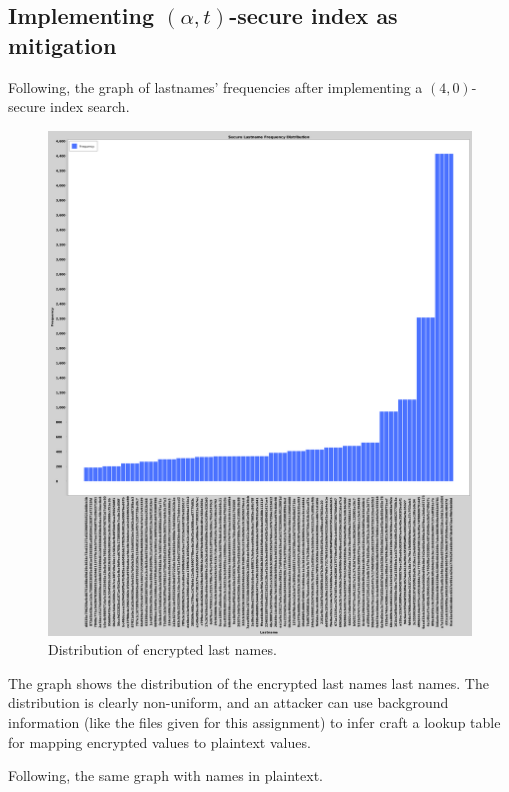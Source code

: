 \subsection{Implementing $(\alpha, t)$-secure index as mitigation}

Following, the graph of lastnames' frequencies after implementing a $(4, 0)$-secure index search.

\begin{figure}[h!]
    \centering
    \includegraphics[width=\textwidth]{03-ex2/Secure_Lastname_Frequency_Distribution.png}
    \caption{Distribution of encrypted last names.}
    \label{fig:Distribution-of-last-names-sec}
\end{figure}

The graph shows the distribution of the encrypted last names last names. The distribution is clearly non-uniform, and an attacker can use background information (like the files given for this assignment) to infer craft a lookup table for mapping encrypted values to plaintext values.

Following, the same graph with names in plaintext.

